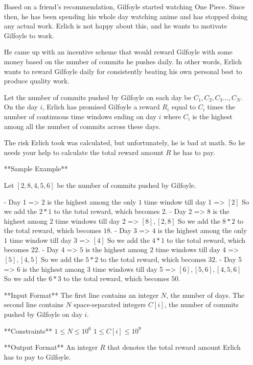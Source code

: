 Based on a friend's recommendation, Gilfoyle started watching One Piece. Since then, he has been spending his whole day watching anime and has stopped doing any actual work. Erlich is not happy about this, and he wants to motivate Gilfoyle to work.

He came up with an incentive scheme that would reward Gilfoyle with some money based on the number of commits he pushes daily. In other words, Erlich wants to reward Gilfoyle daily for consistently beating his own personal best to produce quality work. 

Let the number of commits pushed by Gilfoyle on each day be $C_1, C_2, C_3..., C_N$. On the day $i$, Erlich has promised Gilfoyle a reward $R_i$ equal to $C_i$ times the number of continuous time windows ending on day $i$ where $C_i$ is the highest among all the number of commits across these days. 

The risk Erlich took was calculated, but unfortunately, he is bad at math. So he needs your help to calculate the total reward amount $R$ he has to pay.

**Sample Example**  

Let $[2, 8, 4, 5, 6]$ be the number of commits pushed by Gilfoyle.  

- Day 1 => $2$ is the highest among the only $1$ time window till day 1 => $[2]$  
    So we add the $2 * 1$ to the total reward, which becomes $2$.  
- Day 2 => $8$ is the highest among $2$ time windows till day 2 => $[8], [2, 8]$  
    So we add the $8 * 2$ to the total reward, which becomes $18$.  
- Day 3 => $4$ is the highest among the only $1$ time window till day 3 => $[4]$  
    So we add the $4 * 1$ to the total reward, which becomes $22$.  
- Day 4 => $5$ is the highest among $2$ time windows till day 4 => $[5], [4, 5]$  
    So we add the $5 * 2$ to the total reward, which becomes $32$.  
- Day 5 => $6$ is the highest among $3$ time windows till day 5 => $[6], [5, 6], [4, 5, 6]$  
    So we add the $6 * 3$ to the total reward, which becomes $50$.


**Input Format**  
The first line contains an integer $N$, the number of days.
The second line contains $N$ space-separated integers $C[i]$, the number of commits pushed by Gilfoyle on day $i$.

**Constraints**  
$1 \leq N \leq 10^6$  
$1 \leq C[i] \leq 10^9$

**Output Format**  
An integer $R$ that denotes the total reward amount Erlich has to pay to Gilfoyle.
